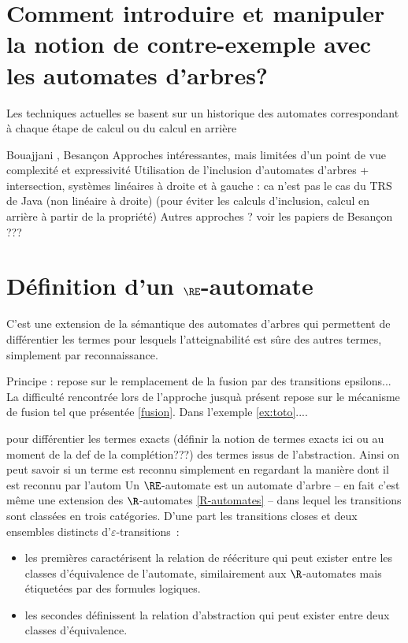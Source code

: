 
\section{Comment introduire et manipuler la notion de contre-exemple avec les automates d'arbres?}

{Les techniques actuelles se basent sur un historique des automates correspondant à chaque étape de calcul ou du calcul en arrière}

{Bouajjani \cite{artmc06}, Besançon \cite{fib:arra08}}
{Approches intéressantes, mais limitées d'un point de vue complexité et expressivité}
{Utilisation de l'inclusion d'automates d'arbres + intersection, systèmes linéaires à droite et
  à gauche : ca n'est pas le cas du TRS de Java (non linéaire à droite) (pour éviter les calculs d'inclusion, calcul en arrière à partir de la propriété)}
{Autres approches ? voir les papiers de Besançon ???}

\section{Définition d'un $\RE$-automate}

C'est une extension de la sémantique des automates d'arbres qui permettent
de différentier les termes pour lesquels l'atteignabilité est sûre des autres termes,
simplement par reconnaissance.

Principe : repose sur le remplacement de la fusion par des transitions epsilons...
La difficulté rencontrée lors de l'approche jusquà présent repose sur le mécanisme
de fusion tel que présentée \ref{fusion}. Dans l'exemple \ref{ex:toto}....




pour différentier les termes exacts (définir la notion de termes exacts ici ou au moment de la def de la complétion???)
des termes issus de l'abstraction. Ainsi on peut savoir si un terme est reconnu simplement en regardant la manière dont 
il est reconnu par l'autom
\bigskip
Un $\RE$-automate est un automate d'arbre -- en fait c'est même une extension des $\R$-automates
\ref{R-automates} -- dans lequel les transitions sont classées en trois catégories.  D'une part les
transitions closes et deux ensembles distincts d'$\varepsilon$-transitions~:
\begin{itemize}
\item les premières caractérisent la relation de réécriture qui peut exister entre les classes
  d'équivalence de l'automate, similairement aux $\R$-automates mais étiquetées par des formules
  logiques.

\item les secondes définissent la relation d'abstraction qui peut exister entre deux classes d'équivalence.
\end{itemize}

